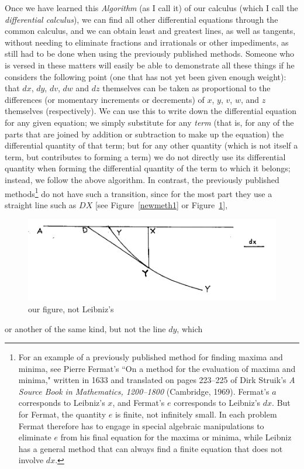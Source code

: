 \documentclass[polutonikogreek,english,twoside,openright]{article}
\begin{document}
Once we have learned this {\em Algorithm} (as I call it) of our
calculus (which I call the {\em differential calculus}), we can find
all other differential equations through the common calculus, and we
can obtain least and greatest lines, as well as tangents, without
needing to eliminate fractions and irrationals or other impediments,
as still had to be done when using the previously published methods.
Someone who is versed in these matters will easily be able to
demonstrate all these things if he considers the following point (one
that has not yet been given enough weight): that $dx$, $dy$, $dv$,
$dw$ and $dz$ themselves can be taken as proportional to the
differences (or momentary increments or decrements) of $x$, $y$, $v$,
$w$, and $z$ themselves (respectively).  We can use this to write down
the differential equation \label{nmdiffeq} for any given equation; we
simply substitute for any {\em term} (that is, for any of the parts
that are joined by addition or subtraction to make up the equation)
the differential quantity of that term; but for any other quantity
(which is not itself a term, but contributes to forming a term) we do
not directly use its differential quantity when forming the
differential quantity of the term to which it belongs; instead, we
follow the above algorithm. In
contrast, the previously published methods\footnote{For an example of
  a previously published method for finding maxima and minima, see
  Pierre Fermat's ``On a method for the evaluation of maxima and
  minima," written in 1633 and translated on pages 223--225 of Dirk
  Struik's {\em A Source Book in Mathematics, 1200--1800} (Cambridge,
  1969). Fermat's $a$ corresponds to Leibniz's $x$, and Fermat's $e$
  corresponds to Leibniz's $dx$.  But for Fermat, the quantity $e$ is
  finite, not infinitely small.  In each problem Fermat therefore has
  to engage in special algebraic manipulations to eliminate $e$ from
  his final equation for the maxima or minima, while Leibniz has a
  general method that can always find a finite equation that does not
  involve $dx$. } do not have such a transition, since for the most
part they use a straight line such as $DX$ [see Figure~\ref{newmeth1}
or Figure~\ref{tanandord}],
\begin{figure}[htp]
  \begin{center}
    \includegraphics[width=.75\textwidth]{fig/Figure19}
    \caption{our figure, not Leibniz's}
    \label{tanandord}
  \end{center}
\end{figure} or another of the same kind, but not the line $dy$, which
\end{document}
